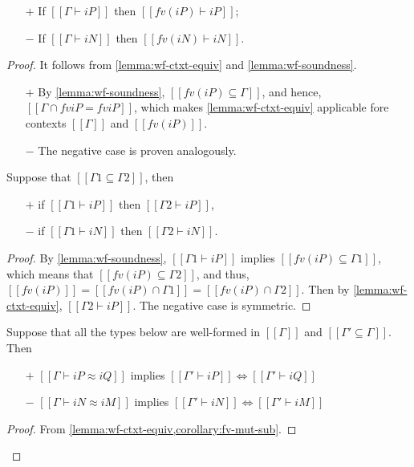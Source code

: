 \begin{corollary}
  \label{corollary:wf-ctxt-strengthening}
  \hfill
  
  \begin{itemize}
    \item [$+$] If $[[Γ ⊢ iP]]$ then $[[fv(iP) ⊢ iP]]$;
    \item [$-$] If $[[Γ ⊢ iN]]$ then $[[fv(iN) ⊢ iN]]$.
  \end{itemize}
\end{corollary}
\begin{proof}
  It follows from \cref{lemma:wf-ctxt-equiv} and \cref{lemma:wf-soundness}.
  \begin{itemize}
    \item [$+$] 
      By \cref{lemma:wf-soundness}, $[[fv(iP) ⊆ Γ]]$, and hence,
      $[[Γ ∩ fv iP = fv iP ]]$, which makes \cref{lemma:wf-ctxt-equiv}
      applicable fore contexts $[[Γ]]$ and $[[fv(iP)]]$.
    \item[$-$] The negative case is proven analogously.
  \end{itemize}

\begin{corollary}
  \label{lemma:wf-weakening}
  Suppose that $[[Γ1 ⊆ Γ2]]$, then
  \begin{itemize}
    \item[$+$] if $[[Γ1 ⊢ iP]]$ then $[[Γ2 ⊢ iP]]$,
    \item[$-$] if $[[Γ1 ⊢ iN]]$ then $[[Γ2 ⊢ iN]]$.
  \end{itemize}
\end{corollary}
\begin{proof}
  By \cref{lemma:wf-soundness},
  $[[Γ1 ⊢ iP]]$ implies $[[fv(iP) ⊆ Γ1]]$,
  which means that $[[fv(iP) ⊆ Γ2]]$,
  and thus, $[[fv(iP)]] = [[fv(iP) ∩ Γ1]] = [[fv(iP) ∩ Γ2]]$.
  Then by \cref{lemma:wf-ctxt-equiv}, $[[Γ2 ⊢ iP]]$. 
  The negative case is symmetric.
\end{proof}


\begin{corollary}
  \label{lemma:mut-sub-types-wf-equiv}
  Suppose that all the types below are well-formed in $[[Γ]]$ and
  $[[Γ' ⊆ Γ]]$. Then
  \begin{itemize}
  \item[$+$] $[[Γ ⊢ iP ≈ iQ]]$ implies $[[Γ' ⊢ iP]] \iff [[Γ' ⊢ iQ]]$
  \item[$-$] $[[Γ ⊢ iN ≈ iM]]$ implies $[[Γ' ⊢ iN]] \iff [[Γ' ⊢ iM]]$
  \end{itemize}
\end{corollary}
\begin{proof}
  From \cref{lemma:wf-ctxt-equiv,corollary:fv-mut-sub}.
\end{proof}



\end{proof}
